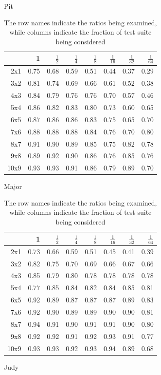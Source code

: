 \documentclass[conference]{IEEEtran}
\begin{document}
\begin{table}
\begin{minipage}{.33\linewidth}
\caption*{Pit}
  \end{minipage}
  \begin{minipage}{.33\linewidth}
  \centering
{\small
\begin{tabular}{rrrrrrrr}
  \hline
 & 1 & $\frac{1}{2}$ & $\frac{1}{4}$ & $\frac{1}{8}$ & $\frac{1}{16}$ & $\frac{1}{32}$ & $\frac{1}{64}$ \\ 
  \hline
2x1 & 0.75 & 0.68 & 0.59 & 0.51 & 0.44 & 0.37 & 0.29 \\ 
  3x2 & 0.81 & 0.74 & 0.69 & 0.66 & 0.61 & 0.52 & 0.38 \\ 
  4x3 & 0.84 & 0.79 & 0.76 & 0.76 & 0.70 & 0.57 & 0.46 \\ 
  5x4 & 0.86 & 0.82 & 0.83 & 0.80 & 0.73 & 0.60 & 0.65 \\ 
  6x5 & 0.87 & 0.86 & 0.86 & 0.83 & 0.75 & 0.65 & 0.70 \\ 
  7x6 & 0.88 & 0.88 & 0.88 & 0.84 & 0.76 & 0.70 & 0.80 \\ 
  8x7 & 0.91 & 0.90 & 0.89 & 0.85 & 0.75 & 0.82 & 0.78 \\ 
  9x8 & 0.89 & 0.92 & 0.90 & 0.86 & 0.76 & 0.85 & 0.76 \\ 
  10x9 & 0.93 & 0.93 & 0.91 & 0.86 & 0.79 & 0.89 & 0.70 \\ 
   \hline
\end{tabular}
}


\caption*{Major}
  \end{minipage}
  \begin{minipage}{.33\linewidth}
  \centering
{\small
\begin{tabular}{rrrrrrrr}
  \hline
 & 1 & $\frac{1}{2}$ & $\frac{1}{4}$ & $\frac{1}{8}$ & $\frac{1}{16}$ & $\frac{1}{32}$ & $\frac{1}{64}$ \\ 
  \hline
2x1 & 0.73 & 0.66 & 0.59 & 0.51 & 0.45 & 0.41 & 0.39 \\ 
  3x2 & 0.82 & 0.75 & 0.70 & 0.69 & 0.66 & 0.67 & 0.66 \\ 
  4x3 & 0.85 & 0.79 & 0.80 & 0.78 & 0.78 & 0.78 & 0.78 \\ 
  5x4 & 0.77 & 0.85 & 0.84 & 0.82 & 0.84 & 0.85 & 0.81 \\ 
  6x5 & 0.92 & 0.89 & 0.87 & 0.87 & 0.87 & 0.89 & 0.83 \\ 
  7x6 & 0.92 & 0.90 & 0.89 & 0.89 & 0.90 & 0.90 & 0.81 \\ 
  8x7 & 0.94 & 0.91 & 0.90 & 0.91 & 0.91 & 0.90 & 0.80 \\ 
  9x8 & 0.92 & 0.92 & 0.91 & 0.92 & 0.93 & 0.91 & 0.77 \\ 
  10x9 & 0.93 & 0.93 & 0.92 & 0.93 & 0.94 & 0.89 & 0.68 \\ 
   \hline
\end{tabular}
}


\caption*{Judy}
  \end{minipage}
\caption*{The row names indicate the ratios being examined, while columns indicate the fraction of test suite being considered}
\label{tbl:kille}
\end{table}
\end{document}
